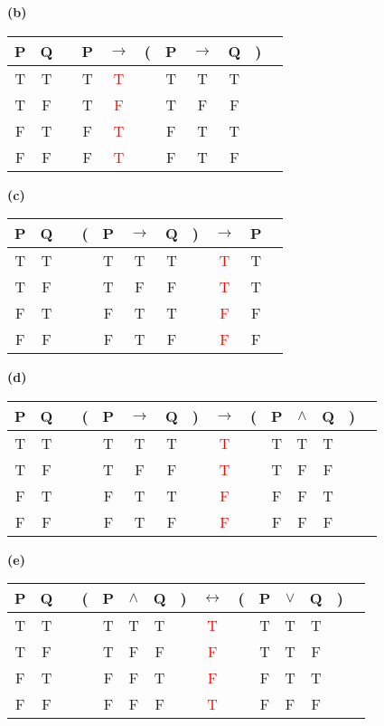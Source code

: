 \documentclass{article}
\begin{document}
\textbf{(b)}

\begin{tabular}{@{ }c@{ }@{ }c | c@{ }@{ }c@{ }@{ }c@{ }@{}c@{}@{ }c@{ }@{ }c@{ }@{ }c@{ }@{}c@{}@{ }c}
P & Q &  & P & $\rightarrow$ & ( & P & $\rightarrow$ & Q & ) & \\
\hline 
T & T &  & T & \textcolor{red}{T} &  & T & T & T &  & \\
T & F &  & T & \textcolor{red}{F} &  & T & F & F &  & \\
F & T &  & F & \textcolor{red}{T} &  & F & T & T &  & \\
F & F &  & F & \textcolor{red}{T} &  & F & T & F &  & \\
\end{tabular}

\textbf{(c)}

\begin{tabular}{@{ }c@{ }@{ }c | c@{ }@{}c@{}@{ }c@{ }@{ }c@{ }@{ }c@{ }@{}c@{}@{ }c@{ }@{ }c@{ }@{ }c}
P & Q &  & ( & P & $\rightarrow$ & Q & ) & $\rightarrow$ & P & \\
\hline 
T & T &  &  & T & T & T &  & \textcolor{red}{T} & T & \\
T & F &  &  & T & F & F &  & \textcolor{red}{T} & T & \\
F & T &  &  & F & T & T &  & \textcolor{red}{F} & F & \\
F & F &  &  & F & T & F &  & \textcolor{red}{F} & F & \\
\end{tabular}

\textbf{(d)}

\begin{tabular}{@{ }c@{ }@{ }c | c@{ }@{}c@{}@{ }c@{ }@{ }c@{ }@{ }c@{ }@{}c@{}@{ }c@{ }@{}c@{}@{ }c@{ }@{ }c@{ }@{ }c@{ }@{}c@{}@{ }c}
P & Q &  & ( & P & $\rightarrow$ & Q & ) & $\rightarrow$ & ( & P & $\land$ & Q & ) & \\
\hline 
T & T &  &  & T & T & T &  & \textcolor{red}{T} &  & T & T & T &  & \\
T & F &  &  & T & F & F &  & \textcolor{red}{T} &  & T & F & F &  & \\
F & T &  &  & F & T & T &  & \textcolor{red}{F} &  & F & F & T &  & \\
F & F &  &  & F & T & F &  & \textcolor{red}{F} &  & F & F & F &  & \\
\end{tabular}

\textbf{(e)}

\begin{tabular}{@{ }c@{ }@{ }c | c@{ }@{}c@{}@{ }c@{ }@{ }c@{ }@{ }c@{ }@{}c@{}@{ }c@{ }@{}c@{}@{ }c@{ }@{ }c@{ }@{ }c@{ }@{}c@{}@{ }c}
P & Q &  & ( & P & $\land$ & Q & ) & $\leftrightarrow$ & ( & P & $\lor$ & Q & ) & \\
\hline 
T & T &  &  & T & T & T &  & \textcolor{red}{T} &  & T & T & T &  & \\
T & F &  &  & T & F & F &  & \textcolor{red}{F} &  & T & T & F &  & \\
F & T &  &  & F & F & T &  & \textcolor{red}{F} &  & F & T & T &  & \\
F & F &  &  & F & F & F &  & \textcolor{red}{T} &  & F & F & F &  & \\
\end{tabular}
\end{document}

